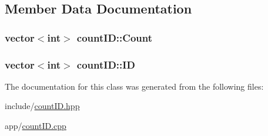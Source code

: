 \subsection{Member Data Documentation}
\subsubsection[{\texorpdfstring{Count}{Count}}]{\setlength{\rightskip}{0pt plus 5cm}vector$<$int$>$ count\+I\+D\+::\+Count}\hypertarget{classcountID_ab579fb8cf43eaaf5e56ff9efec53be7b}{}\label{classcountID_ab579fb8cf43eaaf5e56ff9efec53be7b}
\subsubsection[{\texorpdfstring{ID}{ID}}]{\setlength{\rightskip}{0pt plus 5cm}vector$<$int$>$ count\+I\+D\+::\+ID}\hypertarget{classcountID_aa19098f252bab94e0c50937e5a189eb5}{}\label{classcountID_aa19098f252bab94e0c50937e5a189eb5}


The documentation for this class was generated from the following files\+:\begin{DoxyCompactItemize}
\item 
include/\hyperlink{countID_8hpp}{count\+I\+D.\+hpp}\item 
app/\hyperlink{countID_8cpp}{count\+I\+D.\+cpp}\end{DoxyCompactItemize}
